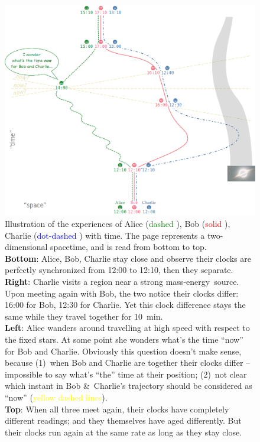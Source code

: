 \documentclass[a4paper,12pt,%
onecolumn,oneside,titlepage,%
british%
]{memoir}
\newcommand*{\amp}{\&}
\renewcommand*{\|}[1][]{\nonscript\:#1\vert\nonscript\:\mathopen{}}
\newcommand*{\masse}{mass-energy}
\begin{document}
\begin{figure}[p]
  \includegraphics[width=\linewidth]{images/ABC_spacetime.png}
  \caption{Illustration of the experiences of Alice (\textcolor{green}{dashed }), Bob (\textcolor{red}{solid }), Charlie (\textcolor{blue}{dot-dashed }) with time. The page represents a two-dimensional spacetime, and is read from bottom to top.
\\\textbf{Bottom}: Alice, Bob, Charlie stay close and observe their clocks are perfectly synchronized from 12:00 to 12:10, then they separate.
\\\textbf{Right}: Charlie visits a region near a strong \masse\ source. Upon meeting again with Bob, the two notice their clocks differ: 16:00 for Bob, 12:30 for Charlie. Yet this clock difference stays the same while they travel together for \qty{10}{min}.
\\\textbf{Left}: Alice wanders around travelling at high speed with respect to the fixed stars. At some point she wonders what's the time \enquote{now} for Bob and Charlie. Obviously this question doesn't make sense, because
(1)~when Bob and Charlie are together their clocks differ -- impossible to say what's \enquote{the} time at their position; (2)~not clear which instant in Bob \amp\ Charlie's trajectory should be considered as \enquote{now} (\textcolor{yellow}{yellow dashed lines}).
\\\textbf{Top}: When all three meet again, their clocks have completely different readings; and they themselves have aged differently. But their clocks run again at the same rate as long as they stay close.}  \label{fig:ABC_spacetime}
\end{figure}
\end{document}
